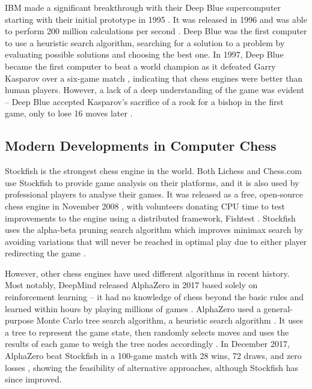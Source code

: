 \documentclass[a4paper, 11pt]{article}
\begin{document}
IBM made a significant breakthrough with their Deep Blue supercomputer starting with their initial prototype in 1995 \cite{hsu1995deep}. It was released in 1996 \cite{hsu1999ibm} and was able to perform 200 million calculations per second \cite{strogatz2018one}. Deep Blue was the first computer to use a heuristic search algorithm, searching for a solution to a problem by evaluating possible solutions and choosing the best one. In 1997, Deep Blue became the first computer to beat a world champion as it defeated Garry Kasparov over a six-game match \cite{seirawan1997implications}, indicating that chess engines were better than human players. However, a lack of a deep understanding of the game was evident -- Deep Blue accepted Kasparov's sacrifice of a rook for a bishop in the first game, only to lose 16 moves later \cite{strogatz2018one}.

\subsection{Modern Developments in Computer Chess}
Stockfish is the strongest chess engine in the world. Both Lichess and Chess.com use Stockfish to provide game analysis on their platforms, and it is also used by professional players to analyse their games. It was released as a free, open-source chess engine in November 2008 \cite{aboutStockfish}, with volunteers donating CPU time to test improvements to the engine using a distributed framework, Fishtest \cite{fishtestDistributedTestingFramework}. Stockfish uses the alpha-beta pruning search algorithm which improves minimax search \cite{v1928theorie} by avoiding variations that will never be reached in optimal play due to either player redirecting the game \cite{maharaj2022chess}.

However, other chess engines have used different algorithms in recent history. Most notably, DeepMind released AlphaZero in 2017 \cite{silver2017mastering2} based solely on reinforcement learning -- it had no knowledge of chess beyond the basic rules and learned within hours by playing millions of games \cite{strogatz2018one}. AlphaZero used a general-purpose Monte Carlo tree search algorithm, a heuristic search algorithm \cite{silver2017mastering2}. It uses a tree to represent the game state, then randomly selects moves and uses the results of each game to weigh the tree nodes accordingly \cite{chaslot2008monte}. In December 2017, AlphaZero beat Stockfish in a 100-game match with 28 wins, 72 draws, and zero losses \cite{klein2017google}, showing the feasibility of alternative approaches, although Stockfish has since improved.
\end{document}
